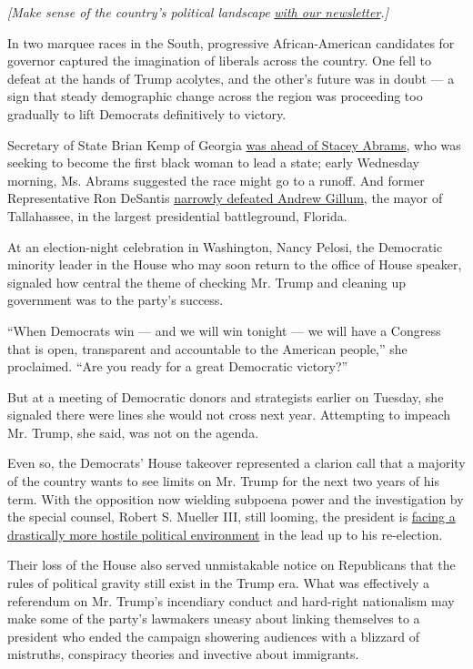 \emph{{[}Make sense of the country's political landscape}
\href{https://www.nytimes.com/newsletters/politics?smid=rd\%3Faction\%3Dclick\&module=inline\&pgtype=Article}{\emph{with
our newsletter}}\emph{.{]}}

In two marquee races in the South, progressive African-American
candidates for governor captured the imagination of liberals across the
country. One fell to defeat at the hands of Trump acolytes, and the
other's future was in doubt --- a sign that steady demographic change
across the region was proceeding too gradually to lift Democrats
definitively to victory.

Secretary of State Brian Kemp of Georgia
\href{https://www.nytimes.com/elections/results/georgia-governor}{was
ahead of Stacey Abrams}, who was seeking to become the first black woman
to lead a state; early Wednesday morning, Ms. Abrams suggested the race
might go to a runoff. And former Representative Ron DeSantis
\href{https://www.nytimes.com/2018/11/06/us/florida-desantis-gillum-governor.html}{narrowly
defeated Andrew Gillum}, the mayor of Tallahassee, in the largest
presidential battleground, Florida.

At an election-night celebration in Washington, Nancy Pelosi, the
Democratic minority leader in the House who may soon return to the
office of House speaker, signaled how central the theme of checking Mr.
Trump and cleaning up government was to the party's success.

``When Democrats win --- and we will win tonight --- we will have a
Congress that is open, transparent and accountable to the American
people,'' she proclaimed. ``Are you ready for a great Democratic
victory?''

But at a meeting of Democratic donors and strategists earlier on
Tuesday, she signaled there were lines she would not cross next year.
Attempting to impeach Mr. Trump, she said, was not on the agenda.

Even so, the Democrats' House takeover represented a clarion call that a
majority of the country wants to see limits on Mr. Trump for the next
two years of his term. With the opposition now wielding subpoena power
and the investigation by the special counsel, Robert S. Mueller III,
still looming, the president is
\href{https://www.nytimes.com/2018/11/07/us/politics/trump-house-midterm-election.html}{facing
a drastically more hostile political environment} in the lead up to his
re-election.

Their loss of the House also served unmistakable notice on Republicans
that the rules of political gravity still exist in the Trump era. What
was effectively a referendum on Mr. Trump's incendiary conduct and
hard-right nationalism may make some of the party's lawmakers uneasy
about linking themselves to a president who ended the campaign showering
audiences with a blizzard of mistruths, conspiracy theories and
invective about immigrants.

